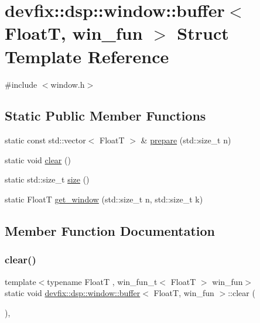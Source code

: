 \hypertarget{structdevfix_1_1dsp_1_1window_1_1buffer}{}\section{devfix\+:\+:dsp\+:\+:window\+:\+:buffer$<$ FloatT, win\+\_\+fun $>$ Struct Template Reference}
\label{structdevfix_1_1dsp_1_1window_1_1buffer}


{\ttfamily \#include $<$window.\+h$>$}

\subsection*{Static Public Member Functions}
\begin{DoxyCompactItemize}
\item 
static const std\+::vector$<$ FloatT $>$ \& \hyperlink{structdevfix_1_1dsp_1_1window_1_1buffer_a3ace062676326a9981118d53b8ba5900}{prepare} (std\+::size\+\_\+t n)
\item 
static void \hyperlink{structdevfix_1_1dsp_1_1window_1_1buffer_a525423f47082a367abe172a6ac61e65d}{clear} ()
\item 
static std\+::size\+\_\+t \hyperlink{structdevfix_1_1dsp_1_1window_1_1buffer_af1215d236069b0848e7211e5f697b3fa}{size} ()
\item 
static FloatT \hyperlink{structdevfix_1_1dsp_1_1window_1_1buffer_a877f872e06b4709189e15c38f247445f}{get\+\_\+window} (std\+::size\+\_\+t n, std\+::size\+\_\+t k)
\end{DoxyCompactItemize}


\subsection{Member Function Documentation}
\mbox{\label{structdevfix_1_1dsp_1_1window_1_1buffer_a525423f47082a367abe172a6ac61e65d}} 
\subsubsection{\texorpdfstring{clear()}{clear()}}
{\footnotesize\ttfamily template$<$typename FloatT , win\+\_\+fun\+\_\+t$<$ Float\+T $>$ win\+\_\+fun$>$ \\
static void \hyperlink{structdevfix_1_1dsp_1_1window_1_1buffer}{devfix\+::dsp\+::window\+::buffer}$<$ FloatT, win\+\_\+fun $>$\+::clear (\begin{DoxyParamCaption}{ }\end{DoxyParamCaption})\hspace{0.3cm}{\ttfamily [inline]}, {\ttfamily [static]}}

